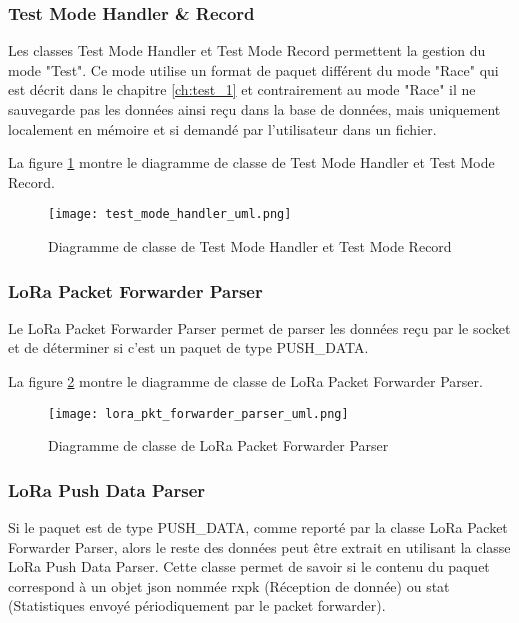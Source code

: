 \subsubsection{Test Mode Handler \& Record}

Les classes Test Mode Handler et Test Mode Record permettent la gestion du mode "Test". Ce mode utilise un format de paquet différent du mode "Race" qui est décrit dans le chapitre \ref{ch:test_1} et contrairement au mode "Race" il ne sauvegarde pas les données ainsi reçu dans la base de données, mais uniquement localement en mémoire et si demandé par l'utilisateur dans un fichier.

La figure \ref{fig:test_mode_handler_uml} montre le diagramme de classe de Test Mode Handler et Test Mode Record.

\begin{figure}[htb]
\centering 
\texttt{[image: test\_mode\_handler\_uml.png]} 
\caption{Diagramme de classe de Test Mode Handler et Test Mode Record}
\label{fig:test_mode_handler_uml}
 \end{figure}

\subsubsection{LoRa Packet Forwarder Parser}

Le LoRa Packet Forwarder Parser permet de parser les données reçu par le socket et de déterminer si c'est un paquet de type PUSH\_DATA.

La figure \ref{fig:lora_pkt_forwarder_parser_uml} montre le diagramme de classe de LoRa Packet Forwarder Parser.

\begin{figure}[htb]
\centering 
\texttt{[image: lora\_pkt\_forwarder\_parser\_uml.png]} 
\caption{Diagramme de classe de LoRa Packet Forwarder Parser}
\label{fig:lora_pkt_forwarder_parser_uml}
 \end{figure}

\subsubsection{LoRa Push Data Parser}

Si le paquet est de type PUSH\_DATA, comme reporté par la classe LoRa Packet Forwarder Parser, alors le reste des données peut être extrait en utilisant la classe LoRa Push Data Parser. Cette classe permet de savoir si le contenu du paquet correspond à un objet json nommée rxpk (Réception de donnée) ou stat (Statistiques envoyé périodiquement par le packet forwarder).

